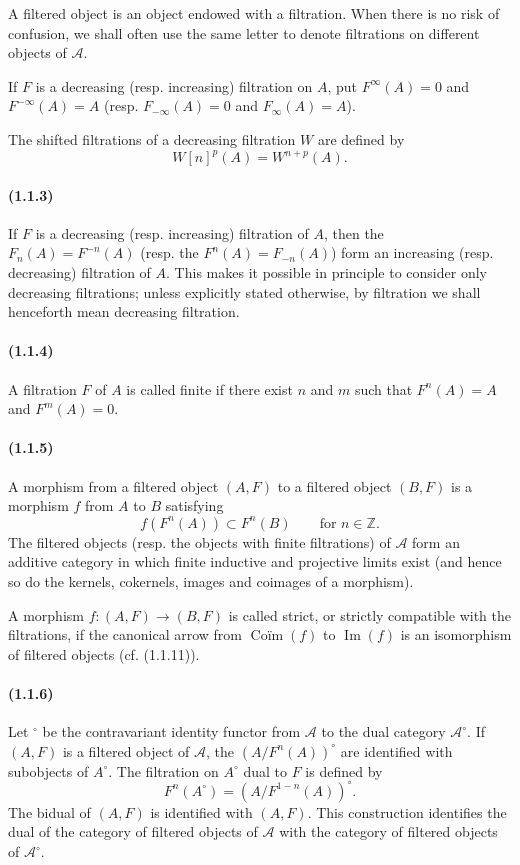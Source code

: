 \documentclass[10pt]{article}
\newcommand{\Z}{\mathbb Z}
\newcommand{\Imop}{\operatorname{Im}}
\newcommand{\fg}{\guillemotright}
\newcommand{\og}{\guillemotleft}
\newcommand{\calA}{\mathcal A}
\begin{document}
A filtered object is an object endowed with a filtration. When there is no risk of confusion, we shall often use the same letter to denote filtrations on different objects of $\calA$.

If $F$ is a decreasing (resp. increasing) filtration on $A$, put $F^\infty(A)=0$ and $F^{-\infty}(A)=A$ (resp. $F_{-\infty}(A)=0$ and $F_{\infty}(A)=A$).

The shifted filtrations of a decreasing filtration $W$ are defined by
\[
W[n]^p(A)=W^{n+p}(A).
\]

\paragraph{(1.1.3)} If $F$ is a decreasing (resp. increasing) filtration of $A$, then the $F_n(A)=F^{-n}(A)$ (resp. the $F^n(A)=F_{-n}(A)$) form an increasing (resp. decreasing) filtration of $A$. This makes it possible in principle to consider only decreasing filtrations; unless explicitly stated otherwise, by \og filtration\fg{} we shall henceforth mean \og decreasing filtration\fg{}.

\paragraph{(1.1.4)} A filtration $F$ of $A$ is called finite if there exist $n$ and $m$ such that $F^n(A)=A$ and $F^m(A)=0$.

\paragraph{(1.1.5)} A morphism from a filtered object $(A,F)$ to a filtered object $(B,F)$ is a morphism $f$ from $A$ to $B$ satisfying
\[
f(F^n(A))\subset F^n(B)\qquad\text{for }n\in\Z.
\]
The filtered objects (resp. the objects with finite filtrations) of $\calA$ form an additive category in which finite inductive and projective limits exist (and hence so do the kernels, cokernels, images and coimages of a morphism).

A morphism $f:(A,F)\to(B,F)$ is called strict, or strictly compatible with the filtrations, if the canonical arrow from $\operatorname{Coïm}(f)$ to $\Imop(f)$ is an isomorphism of filtered objects (cf. (1.1.11)).

\paragraph{(1.1.6)} Let ${}^{\circ}$ be the contravariant identity functor from $\calA$ to the dual category $\calA^{\circ}$. If $(A,F)$ is a filtered object of $\calA$, the $(A/F^n(A))^{\circ}$ are identified with subobjects of $A^{\circ}$. The filtration on $A^{\circ}$ dual to $F$ is defined by
\[
F^n(A^{\circ})=(A/F^{1-n}(A))^{\circ}.
\]
The bidual of $(A,F)$ is identified with $(A,F)$. This construction identifies the dual of the category of filtered objects of $\calA$ with the category of filtered objects of $\calA^{\circ}$.
\end{document}
